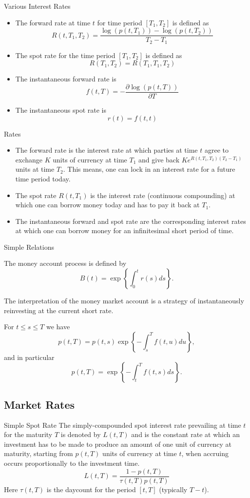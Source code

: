 {Various Interest Rates}

\begin{itemize}
\item <1-> The forward rate at time $t$ for time period
$[T_1,T_2]$ is defined as
\[
R(t,T_1,T_2)=\frac{\log(p(t,T_1))-\log(p(t,T_2))}{T_2-T_1}
\]
\item <2->The spot rate for the time period $[T_1,T_2]$ is defined
as
\[
R(T_1,T_2)=R(T_1,T_1,T_2)
\]
\item<3-> The instantaneous forward rate is
\[
f(t,T)=-\frac{\partial \log(p(t,T))}{\partial T}
\]
\item <4-> The instantaneous spot rate is
\[
r(t)=f(t,t)
\]
\end{itemize}


{Rates}
\begin{itemize}
\item<1-> The forward rate is the interest rate at which parties
at time $t$ agree to exchange $K$ units of currency at time $T_1$
and give back $Ke^{R(t,T_1,T_2)(T_2-T_1)}$ units at time $T_2$.
This means, one can lock in an interest rate for a future time
period today. \item<2->The spot rate $R(t,T_1)$ is the interest
rate (continuous compounding) at which one can borrow money today
and has to pay it back at $T_1$. \item<3->The instantaneous
forward and spot rate are the corresponding interest rates at
which one can borrow money for an infinitesimal short period of
time.
\end{itemize}




{Simple Relations}

The money account process is defined by
$$
B(t) = \exp\left\{ \int_0^t r(s) ds\right\}\!.
$$

The interpretation of the money market account is a strategy of
instantaneously reinvesting at the current short rate.

For $t \leq s \leq T$ we have
$$
p(t,T) = p(t,s) \exp\left\{-\int_s^T f(t,u) du\right\}\!,
$$
and in particular
$$
p(t,T) = \exp\left\{-\int_t^T f(t,s) ds\right\}\!.
$$




\subsection{Market Rates}

{Simple Spot Rate}
The simply-compounded spot interest rate prevailing at time $t$ for
the maturity $T$ is denoted by $L(t,T)$ and is the constant rate
at which an investment has to be made to produce an amount of one
unit of currency at maturity, starting from $p(t,T)$ units of
currency at time $t$, when accruing occurs proportionally to the
investment time.
\begin{equation}\label{LIBOR-spot}
L(t,T)=\frac{1-p(t,T)}{\tau(t,T)p(t,T)}
\end{equation}
Here $\tau(t,T)$ is the
daycount for the period $[t,T]$ (typically $T-t$).



